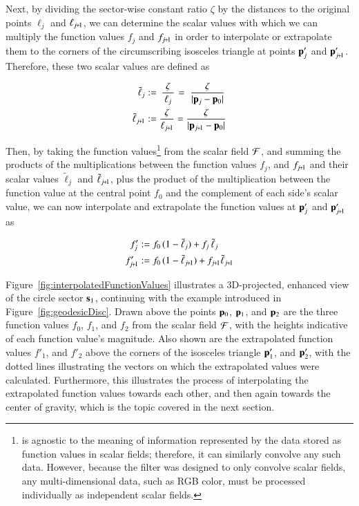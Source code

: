 Next, by dividing the sector-wise constant ratio $\zeta$ by the distances to the original points $\ell_j$ and $\ell_{\sjpo}$, we can determine the scalar values with which we can multiply the function values $f_j$ and $f_{\sjpo}$ in order to interpolate or extrapolate them to the corners of the circumscribing isosceles triangle at points $\mathbf{p}'_j$ and $\bp'_{\sjpo}$. Therefore, these two scalar values are defined as

\begin{align}
	\tilde{\ell}_j & := \kern2pt\frac{\zeta}{\kern2pt\ell_j\kern2pt}\kern1pt = \kern3pt\frac{\zeta}{|\bp_j - \bp_0|}
	\label{eq:distanceIForInterpolation} \\
	\tilde{\ell}_{\sjpo} & := \frac{\zeta}{\ell_{\sjpo}} = \frac{\zeta}{|\bp_{\sjpo} - \bp_0|}
	\label{eq:distanceIp1ForInterpolation}
\end{align}%
%

Then, by taking the function values\footnote{ is agnostic to the meaning of information represented by the data stored as function values in scalar fields; therefore, it can similarly convolve any such data. However, because the filter was designed to only convolve scalar fields, any multi-dimensional data, such as RGB color, must be processed individually as independent scalar fields.} from the scalar field $\mathcal{F}$, and summing the products of the multiplications between the function values $f_j$, and $f_{\sjpo}$ and their scalar values $\tilde{\ell}_j$ and $\tilde{\ell}_{\sjpo}$, plus the product of the multiplication between the function value at the central point $f_0$ and the complement of each side's scalar value, we can now interpolate and extrapolate the function values at $\mathbf{p}'_j$ and $\bp'_{\sjpo}$ as

\begin{align}
	f'_j & := f_0\,(1 - \tilde{\ell}_j) + f_j\,\tilde{\ell}_j
	\label{eq:interpolatedFi} \\
	f'_{\sjpo} & := f_0\,(1 - \tilde{\ell}_{\sjpo}) + f_{\sjpo}\tilde{\ell}_{\sjpo}
	\label{eq:interpolatedFip1}
\end{align}%
%

Figure~\ref{fig:interpolatedFunctionValues} illustrates a 3D-projected, enhanced view of the circle sector $\mathbf{s}_1$, continuing with the example introduced in Figure~\ref{fig:geodesicDisc}. Drawn above the points $\mathbf{p}_0$, $\mathbf{p}_1$, and $\mathbf{p}_2$ are the three function values $f_0$, $f_1$, and $f_2$ from the scalar field $\mathcal{F}$, with the heights indicative of each function value's magnitude. Also shown are the extrapolated function values $f'_1$, and $f'_2$ above the corners of the isosceles triangle $\mathbf{p}'_1$, and $\mathbf{p}'_2$, with the dotted lines illustrating the vectors on which the extrapolated values were calculated. Furthermore, this illustrates the process of interpolating the extrapolated function values towards each other, and then again towards the center of gravity, which is the topic covered in the next section.

